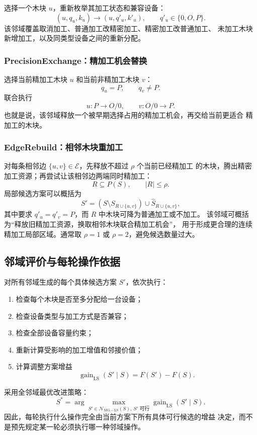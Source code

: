 \documentclass[UTF8,12pt,a4paper]{ctexart}
\newcommand{\E}{\mathcal{E}}
\newcommand{\N}{\mathcal{N}}
\begin{document}
选择一个木块 \(u\)，重新枚举其加工状态和兼容设备：
\[
(u,q_u,k_u)
\longrightarrow
(u,q'_u,k'_u),
\qquad
q'_u\in\{0,O,P\}.
\]
该邻域覆盖取消加工、普通加工改精密加工、精密加工改普通加工、
未加工木块新增加工，以及同类型设备之间的重新分配。

\subsubsection{PrecisionExchange：精加工机会替换}

选择当前精加工木块 \(u\) 和当前非精加工木块 \(v\)：
\[
q_u=P,\qquad q_v\neq P.
\]
联合执行
\[
u:P\rightarrow O/0,
\qquad
v:O/0\rightarrow P.
\]
也就是说，该邻域释放一个被早期选择占用的精加工机会，再交给当前更适合
精加工的木块。

\subsubsection{EdgeRebuild：相邻木块重加工}

对每条相邻边 \(\{u,v\}\in\E\)，先释放不超过 \(\rho\) 个当前已经精加工
的木块，腾出精密加工资源；再尝试让该相邻边两端同时精加工：
\[
R\subseteq P(S),
\qquad
|R|\leq\rho.
\]
局部候选方案可以概括为
\[
S'
=
\left(S\setminus S_{R\cup\{u,v\}}\right)
\cup
\widehat S_{R\cup\{u,v\}},
\]
其中要求 \(q'_u=q'_v=P\)，而 \(R\) 中木块可降为普通加工或不加工。
该邻域可概括为“释放旧精加工资源，换取相邻木块联合精加工机会”，
用于形成更合理的连续精加工局部区域。通常取 \(\rho=1\) 或
\(\rho=2\)，避免候选数量过大。

\subsection{邻域评价与每轮操作依据}

对所有邻域生成的每个具体候选方案 \(S'\)，依次执行：
\begin{enumerate}
  \item 检查每个木块是否至多分配给一台设备；
  \item 检查设备类型与加工方式是否兼容；
  \item 检查全部设备容量约束；
  \item 重新计算受影响的加工增值和邻接价值；
  \item 计算调整方案增益
        \[
        \operatorname{gain}_{\mathrm{LS}}(S'\mid S)=F(S')-F(S).
        \]
\end{enumerate}

采用全邻域最优改进策略：
\[
\boxed{
S^*
=
\arg\max_{
S'\in\N_{\mathrm{MG-LS}}(S),\ S'\text{ 可行}
}
\operatorname{gain}_{\mathrm{LS}}(S'\mid S)
}.
\]
因此，每轮执行什么操作完全由当前方案下所有具体可行候选的增益
决定，而不是预先规定某一轮必须执行哪一种邻域操作。
\end{document}
